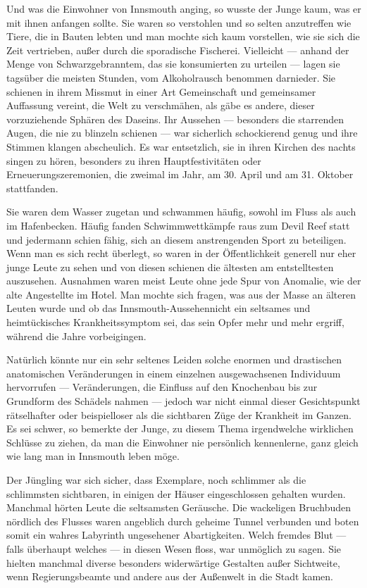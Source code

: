 Und was die Einwohner von Innsmouth anging, so wusste der Junge kaum, was er mit ihnen anfangen sollte. Sie waren so verstohlen und so selten anzutreffen wie Tiere, die in Bauten lebten und man mochte sich kaum vorstellen, wie sie sich die Zeit vertrieben, außer durch die sporadische Fischerei. Vielleicht --- anhand der Menge von Schwarzgebranntem, das sie konsumierten zu urteilen --- lagen sie tagsüber die meisten Stunden, vom Alkoholrausch benommen darnieder. Sie schienen in ihrem Missmut in einer Art Gemeinschaft und gemeinsamer Auffassung vereint, die Welt zu verschmähen, als gäbe es andere, dieser vorzuziehende Sphären des Daseins. Ihr Aussehen --- besonders die starrenden Augen, die nie zu blinzeln schienen --- war sicherlich schockierend genug und ihre Stimmen klangen abscheulich. Es war entsetzlich, sie in ihren Kirchen des nachts singen zu hören, besonders zu ihren Hauptfestivitäten oder Erneuerungszeremonien, die zweimal im Jahr, am 30. April und am 31. Oktober stattfanden.

Sie waren dem Wasser zugetan und schwammen häufig, sowohl im Fluss als auch im Hafenbecken. Häufig fanden Schwimmwettkämpfe raus zum Devil Reef statt und jedermann schien fähig, sich an diesem anstrengenden Sport zu beteiligen. Wenn man es sich recht überlegt, so waren in der Öffentlichkeit generell nur eher junge Leute zu sehen und von diesen schienen die ältesten am entstelltesten auszusehen. Ausnahmen waren meist Leute ohne jede Spur von Anomalie, wie der alte Angestellte im Hotel. Man mochte sich fragen, was aus der Masse an älteren Leuten wurde und ob das \glqq Innsmouth-Aussehen\grqq  nicht ein seltsames und heimtückisches Krankheitssymptom sei, das sein Opfer mehr und mehr ergriff, während die Jahre vorbeigingen.

Natürlich könnte nur ein sehr seltenes Leiden solche enormen und drastischen anatomischen Veränderungen in einem einzelnen ausgewachsenen Individuum hervorrufen --- Veränderungen, die Einfluss auf den Knochenbau bis zur Grundform des Schädels nahmen --- jedoch war nicht einmal dieser Gesichtspunkt rätselhafter oder beispielloser als die sichtbaren Züge der Krankheit im Ganzen. Es sei schwer, so bemerkte der Junge, zu diesem Thema irgendwelche wirklichen Schlüsse zu ziehen, da man die Einwohner nie persönlich kennenlerne, ganz gleich wie lang man in Innsmouth leben möge.

Der Jüngling war sich sicher, dass Exemplare, noch schlimmer als die schlimmsten sichtbaren, in einigen der  Häuser eingeschlossen gehalten wurden. Manchmal hörten Leute die seltsamsten Geräusche. Die wackeligen  Bruchbuden nördlich des Flusses waren angeblich durch geheime Tunnel verbunden und boten somit ein wahres Labyrinth ungesehener Abartigkeiten. Welch fremdes Blut --- falls überhaupt welches --- in diesen Wesen floss, war unmöglich zu sagen. Sie hielten manchmal diverse besonders widerwärtige Gestalten außer Sichtweite, wenn Regierungsbeamte und andere aus der Außenwelt in die Stadt kamen.

